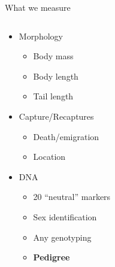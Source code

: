 \documentclass[10pt]{beamer}%
\begin{document}
\begin{frame}{What we measure}

\begin{columns}
	\begin{column}[c]{0.4\textwidth}
		\begin{itemize}
			\item<2-> Morphology
				\begin{itemize}
					\item Body mass 
					\item Body length
					\item Tail length
				\end{itemize}
			\item<3-> Capture/Recaptures
				\begin{itemize}
					\item Death/emigration
					\item Location
				\end{itemize}
			\item<4-> DNA
				\begin{itemize}
					\item 20 ``neutral'' markers
					\item Sex identification
					\item Any genotyping
					\item<5-> \textbf{Pedigree}
				\end{itemize}
		\end{itemize}
	\end{column}
	
	\begin{column}[c]{0.6\textwidth}

	\centering

	\end{column}
\end{columns}
\end{frame}




\end{document}
